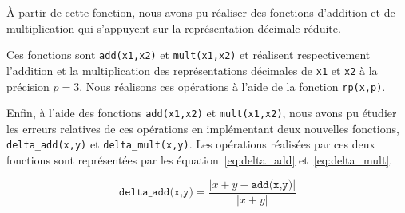 \documentclass{article}
\begin{document}


  






 
À partir de cette fonction, nous avons pu réaliser des fonctions d'addition et de multiplication qui s'appuyent sur la représentation décimale réduite.

Ces fonctions sont \verb|add(x1,x2)| et \verb|mult(x1,x2)| et réalisent respectivement l'addition et la multiplication des représentations décimales de \verb|x1| et \verb|x2| à la précision $p=3$. Nous réalisons ces opérations à l'aide de la fonction \verb|rp(x,p)|.
\vskip 1mm ~




  




  
 
Enfin, à l'aide des fonctions \verb|add(x1,x2)| et \verb|mult(x1,x2)|, nous avons pu étudier les erreurs relatives de ces opérations en implémentant deux nouvelles fonctions, \verb|delta_add(x,y)| et \verb|delta_mult(x,y)|. Les opérations réalisées par ces deux fonctions sont représentées par les équation~\ref{eq:delta_add} et~\ref{eq:delta_mult}.

\begin{equation}
  \texttt{delta\_add(x,y)} = \dfrac{\big\vert x + y - \texttt{add(x,y)} \big\vert}{\big\vert x+y \big\vert}
  \label{eq:delta_add}
\end{equation}
\end{document}
